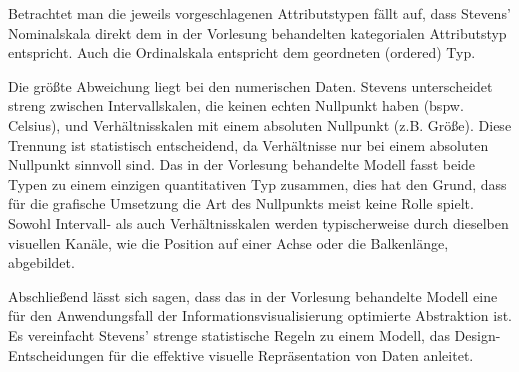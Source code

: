 \documentclass[12pt, a4paper]{article}
\begin{document}
Betrachtet man die jeweils vorgeschlagenen Attributstypen fällt auf, dass Stevens' Nominalskala direkt dem in der Vorlesung behandelten kategorialen Attributstyp
entspricht. Auch die Ordinalskala entspricht dem geordneten (ordered) Typ.


Die größte Abweichung liegt bei den numerischen Daten. Stevens unterscheidet streng zwischen Intervallskalen, die keinen echten Nullpunkt haben (bspw. Celsius), 
und Verhältnisskalen mit einem absoluten Nullpunkt (z.B. Größe). 
Diese Trennung ist statistisch entscheidend, da Verhältnisse nur bei einem absoluten Nullpunkt sinnvoll sind. 
Das in der Vorlesung behandelte Modell fasst beide Typen zu einem einzigen quantitativen Typ zusammen, dies hat den Grund,
dass für die grafische Umsetzung die Art des Nullpunkts meist keine Rolle spielt. 
Sowohl Intervall- als auch Verhältnisskalen werden typischerweise durch dieselben visuellen Kanäle, wie die Position auf einer Achse oder die Balkenlänge, abgebildet.


Abschließend lässt sich sagen, dass das in der Vorlesung behandelte Modell eine für den Anwendungsfall der Informationsvisualisierung optimierte Abstraktion ist. 
Es vereinfacht Stevens' strenge statistische Regeln zu einem Modell, das Design-Entscheidungen für die effektive visuelle Repräsentation von Daten anleitet.
\end{document}
